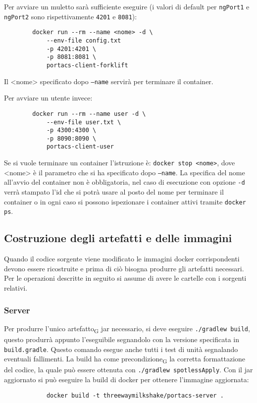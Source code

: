     Per avviare un muletto sarà sufficiente eseguire (i valori di default per \texttt{ngPort1} e \texttt{ngPort2} sono rispettivamente \texttt{4201} e \texttt{8081}):
    \begin{verbatim}
        docker run --rm --name <nome> -d \
            --env-file config.txt
            -p 4201:4201 \
            -p 8081:8081 \
            portacs-client-forklift
    \end{verbatim}
    Il <nome> specificato dopo \texttt{---name} servirà per terminare il container.

    Per avviare un utente invece:
    \begin{verbatim}
        docker run --rm --name user -d \
            --env-file user.txt \
            -p 4300:4300 \
            -p 8090:8090 \
            portacs-client-user
    \end{verbatim}

        Se si vuole terminare un container l'istruzione è: \texttt{docker stop <nome>}, dove <nome> è il parametro che si ha specificato dopo \texttt{---name}. La specifica del nome all'avvio del container non è obbligatoria, nel caso di esecuzione con opzione \texttt{-d} verrà stampato l'id che si potrà usare al posto del nome per terminare il container o in ogni caso si possono ispezionare i container attivi tramite \texttt{docker ps}.

\clearpage
\subsection{Costruzione degli artefatti e delle immagini}
    Quando il codice sorgente viene modificato le immagini docker corrispondenti devono essere ricostruite e prima di ciò bisogna produrre gli artefatti necessari. Per le operazioni descritte in seguito si assume di avere le cartelle con i sorgenti relativi.
    \subsubsection{Server}
        Per produrre l'unico artefatto\textsubscript{G} jar necessario, si deve eseguire \texttt{./gradlew build}, questo produrrà appunto l'eseguibile segnandolo con la versione specificata in \texttt{build.gradle}. Questo comando esegue anche tutti i test di unità segnalando eventuali fallimenti. La build ha come precondizione\textsubscript{G} la corretta formattazione del codice, la quale può essere ottenuta con \texttt{./gradlew spotlessApply}.
        Con il jar aggiornato si può eseguire la build di docker per ottenere l'immagine aggiornata:
        \begin{verbatim}
            docker build -t threewaymilkshake/portacs-server .
        \end{verbatim}

